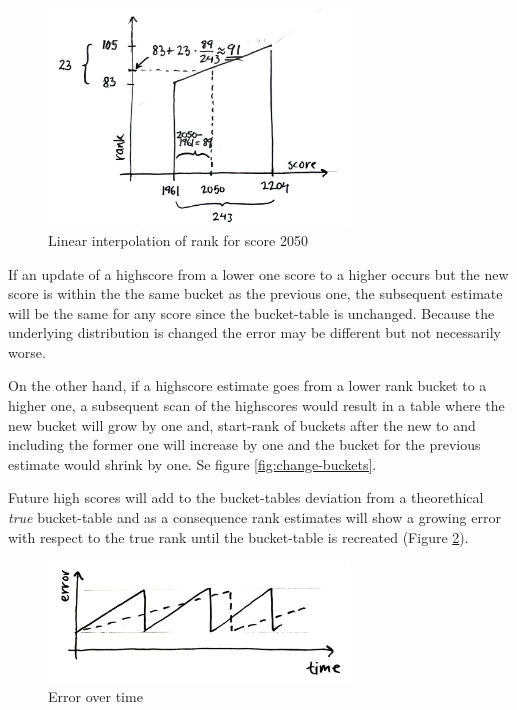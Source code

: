 \begin{figure}[h!]
  \centering
  \caption{Linear interpolation of rank for score 2050}
  \label{fig:interpolation}
  \includegraphics[width=8cm]{img/interpolation.jpg}
\end{figure}

If an update of a highscore from a lower one score to a higher occurs but the new score is within the the same bucket as the previous one, the subsequent estimate will be the same for any score since the bucket-table is unchanged. Because the underlying distribution is changed the error may be different but not necessarily worse.


On the other hand, if a highscore estimate goes from a lower rank bucket to a higher one, a subsequent scan of the highscores would result in a table where the new bucket will grow by one and, start-rank of buckets after the new to and including the former one will increase by one and the bucket for the previous estimate would shrink by one. Se figure \ref{fig:change-buckets}.



Future high scores will add to the bucket-tables deviation from a theorethical \emph{true} bucket-table and as a consequence rank estimates will show a growing error with respect to the true rank until the bucket-table is recreated (Figure \ref{fig:errortime}).

\begin{figure}[h]
  \centering
  \caption{Error over time}
  \label{fig:errortime}
  \includegraphics[width=8cm]{img/hypothesis2.jpg}
\end{figure}

